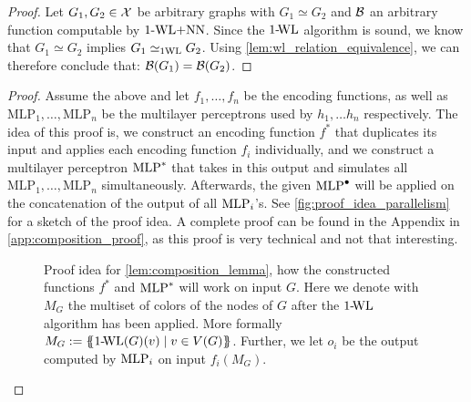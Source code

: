 \begin{proof}
    Let $G_1, G_2 \in \mathcal{X}$ be arbitrary graphs with $G_1 \simeq G_2$ and $\mathcal{B}$ an arbitrary function computable by $\text{1-WL+NN}$. Since the $\text{1-\!WL}$ algorithm is sound, we know that $G_1 \simeq G_2$ implies $G_1 \simeq_{\text{1WL}} G_2$. Using \autoref{lem:wl_relation_equivalence}, we can therefore conclude that: $\mathcal{B}(G_1) = \mathcal{B}(G_2)$.
\end{proof}

\begin{proof}
    Assume the above and let $f_{1}, \ldots, f_{n}$ be the encoding functions, as well as $\text{MLP}_1, \ldots, \text{MLP}_n$ be the multilayer perceptrons used by $h_1, \dots h_n$ respectively. The idea of this proof is, we construct an encoding function $f^*$ that duplicates its input and applies each encoding function $f_i$ individually, and we construct a multilayer perceptron $\text{MLP}^*$ that takes in this output and simulates all $\text{MLP}_1, \ldots, \text{MLP}_n$ simultaneously. Afterwards, the given $\text{MLP}^\bullet$ will be applied on the concatenation of the output of all $\text{MLP}_i$'s.  See \autoref{fig:proof_idea_parallelism} for a sketch of the proof idea. A complete proof can be found in the Appendix in \autoref{app:composition_proof}, as this proof is very technical and not that interesting.

    \begin{figure}[H]
        \centering
        
        \caption{Proof idea for \autoref{lem:composition_lemma}, how the constructed functions $f^*$ and $\text{MLP}^*$ will work on input $G$. Here we denote with $M_G$ the multiset of colors of the nodes of $G$ after the $\text{1-\!WL}$ algorithm has been applied. More formally $M_G := \{\!\!\{ \text{1-\!WL}(G)(v) \mid v \in V(G) \}\!\!\}$. Further, we let $o_i$ be the output computed by $\text{MLP}_i$ on input $f_i(M_G)$.}
        \label{fig:proof_idea_parallelism}
    \end{figure}
\end{proof}
    


